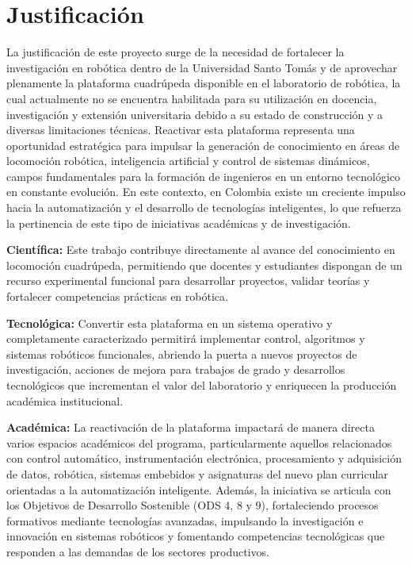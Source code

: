\chapter{Justificación}
La justificación de este proyecto surge de la necesidad de fortalecer la investigación en robótica dentro de la Universidad Santo Tomás y de aprovechar plenamente la plataforma cuadrúpeda disponible en el laboratorio de robótica, la cual actualmente no se encuentra habilitada para su utilización en docencia, investigación y extensión universitaria debido a su estado de construcción y a diversas limitaciones técnicas. Reactivar esta plataforma representa una oportunidad estratégica para impulsar la generación de conocimiento en áreas de locomoción robótica, inteligencia artificial y control de sistemas dinámicos, campos fundamentales para la formación de ingenieros en un entorno tecnológico en constante evolución. En este contexto, en Colombia existe un creciente impulso hacia la automatización y el desarrollo de tecnologías inteligentes, lo que refuerza la pertinencia de este tipo de iniciativas académicas y de investigación.\

\textbf{Científica:} Este trabajo contribuye directamente al avance del conocimiento en locomoción cuadrúpeda, permitiendo que docentes y estudiantes dispongan de un recurso experimental funcional para desarrollar proyectos, validar teorías y fortalecer competencias prácticas en robótica.\

\textbf{Tecnológica:} Convertir esta plataforma en un sistema operativo y completamente caracterizado permitirá implementar control, algoritmos y sistemas robóticos funcionales, abriendo la puerta a nuevos proyectos de investigación, acciones de mejora para trabajos de grado y desarrollos tecnológicos que incrementan el valor del laboratorio y enriquecen la producción académica institucional.\

\textbf{Académica:} La reactivación de la plataforma impactará de manera directa varios espacios académicos del programa, particularmente aquellos relacionados con control automático, instrumentación electrónica, procesamiento y adquisición de datos, robótica, sistemas embebidos y asignaturas del nuevo plan curricular orientadas a la automatización inteligente. Además, la iniciativa se articula con los Objetivos de Desarrollo Sostenible (ODS 4, 8 y 9), fortaleciendo procesos formativos mediante tecnologías avanzadas, impulsando la investigación e innovación en sistemas robóticos y fomentando competencias tecnológicas que responden a las demandas de los sectores productivos.\

